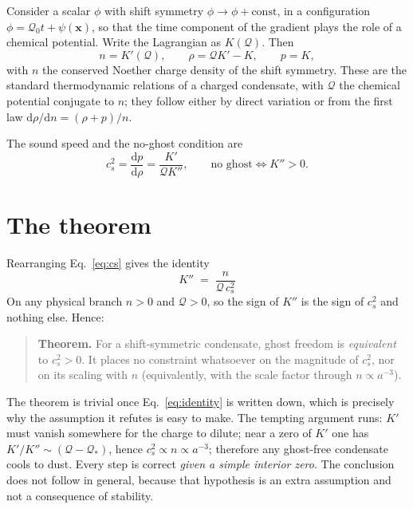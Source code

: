 \documentclass[aps,prd,twocolumn,superscriptaddress,nofootinbib,floatfix]{revtex4-2}
\begin{document}
Consider a scalar $\phi$ with shift symmetry $\phi\to\phi+\text{const}$, in a configuration
$\phi = \mathcal{Q}_0 t + \psi(\mathbf{x})$, so that the time component of the gradient plays
the role of a chemical potential. Write the Lagrangian as $K(\mathcal{Q})$. Then
\begin{equation}
n = K'(\mathcal{Q}),\qquad
\rho = \mathcal{Q}K' - K,\qquad
p = K ,
\label{eq:thermo}
\end{equation}
with $n$ the conserved Noether charge density of the shift symmetry. These are the standard
thermodynamic relations of a charged condensate, with $\mathcal{Q}$ the chemical potential
conjugate to $n$; they follow either by direct variation or from the first law
$\mathrm{d}\rho/\mathrm{d}n = (\rho+p)/n$.

The sound speed and the no-ghost condition are
\begin{equation}
c_s^2 = \frac{\mathrm{d}p}{\mathrm{d}\rho} = \frac{K'}{\mathcal{Q}K''},
\qquad
\text{no ghost}\iff K''>0 .
\label{eq:cs}
\end{equation}

\section{The theorem}

Rearranging Eq.~\eqref{eq:cs} gives the identity
\begin{equation}
\boxed{\;K'' \;=\; \frac{n}{\mathcal{Q}\,c_s^2}\;}
\label{eq:identity}
\end{equation}
On any physical branch $n>0$ and $\mathcal{Q}>0$, so the sign of $K''$ is the sign of $c_s^2$
and nothing else. Hence:

\begin{quote}
\textbf{Theorem.} For a shift-symmetric condensate, ghost freedom is \emph{equivalent} to
$c_s^2>0$. It places no constraint whatsoever on the magnitude of $c_s^2$, nor on its scaling
with $n$ (equivalently, with the scale factor through $n\propto a^{-3}$).
\end{quote}

The theorem is trivial once Eq.~\eqref{eq:identity} is written down, which is precisely why
the assumption it refutes is easy to make. The tempting argument runs: $K'$ must vanish
somewhere for the charge to dilute; near a zero of $K'$ one has $K'/K''\sim(\mathcal{Q}-
\mathcal{Q}_*)$, hence $c_s^2\propto n\propto a^{-3}$; therefore any ghost-free condensate
cools to dust. Every step is correct \emph{given a simple interior zero}. The conclusion does
not follow in general, because that hypothesis is an extra assumption and not a consequence
of stability.
\end{document}
